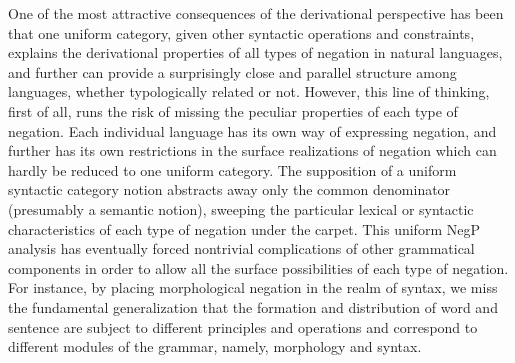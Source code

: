 \documentclass[output=paper]{langsci/langscibook}
\begin{document}
{\begin{exe}
\begin{xlist}
\begin{exe}
\begin{xlist}
One of the most attractive consequences of the
derivational perspective has been that one uniform category,
given other syntactic operations and constraints,
explains the derivational properties of all types of negation
in natural languages, and further can provide a surprisingly
close and parallel structure among languages, whether typologically
related or not. However, this line of thinking, first of all, runs the risk of
missing the peculiar properties of each type of
negation. Each individual language has its own
way of expressing negation, and further has
its own restrictions in the surface realizations of negation which
can hardly be reduced to one uniform category.
%
The supposition of a uniform syntactic category
notion abstracts away only the
common denominator  (presumably a semantic notion), sweeping the
particular lexical or syntactic characteristics of each type of negation
under the carpet. This uniform NegP analysis has eventually forced
nontrivial complications of other grammatical components
in order to allow all the surface
possibilities of each type of negation. For instance,
by placing morphological negation in the realm of syntax, we
miss the fundamental generalization that the formation and
distribution of word and sentence are subject to different principles
and operations and correspond to different modules of the grammar,
namely, morphology and syntax.



\end{xlist}
\end{exe}
\end{xlist}
\end{exe}}
\end{document}
